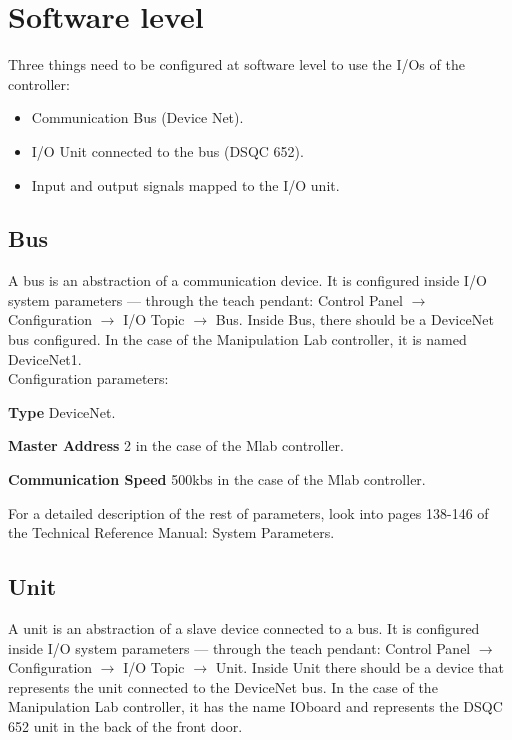 \documentclass[letterpaper,notitlepage,10pt]{article}
\begin{document}
\section{Software level}

Three things need to be configured at software level to use the I/Os
of the controller:
\begin{itemize}
\item Communication Bus (Device Net).
\item I/O Unit connected to the bus (DSQC 652).
\item Input and output signals mapped to the I/O unit.
\end{itemize}

\subsection{Bus}
A bus is an abstraction of a communication device.  It is configured
inside I/O system parameters --- through the teach pendant: Control
Panel $\rightarrow$ Configuration $\rightarrow$ I/O Topic
$\rightarrow$ Bus.  Inside Bus, there should be a DeviceNet bus
configured.  In the case of the Manipulation Lab controller, it is
named DeviceNet1.
\\

Configuration parameters:
\begin{description}
\item \textbf{Type} DeviceNet.
\item \textbf{Master Address} 2 in the case of the Mlab controller.
\item \textbf{Communication Speed} 500kbs in the case of the Mlab
  controller.
\end{description}
For a detailed description of the rest of parameters, look into pages
138-146 of the Technical Reference Manual: System Parameters.

\subsection{Unit}
A unit is an abstraction of a slave device connected to a bus.  It is
configured inside I/O system parameters --- through the teach pendant:
Control Panel $\rightarrow$ Configuration $\rightarrow$ I/O
Topic $\rightarrow$ Unit.  Inside Unit there should
be a device that represents the unit connected to the DeviceNet
bus. In the case of the Manipulation Lab controller, it has the name IOboard and
represents the DSQC 652 unit in the back of the front door.
\\
\end{document}

